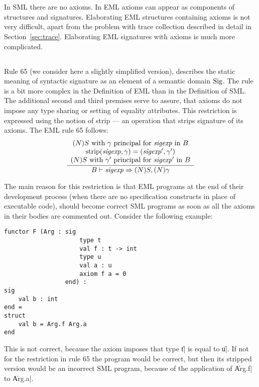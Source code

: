 \section{\secaxiom}
\label{sec:axiom}

In SML there are no axioms. In EML axioms can appear as components of structures and signatures.
Elaborating EML structures containing axioms is not very difficult, apart from the problem with
trace collection described in detail in Section~\ref{sec:trace}.
Elaborating EML signatures with axioms is much more complicated.

\subsection{\secinsig}
\label{sec:in_sig}

Rule 65 (we consider here a slightly simplified version), 
describes the static meaning of syntactic signature
as an element of a semantic domain ${\rm Sig}$.
The rule is a bit more complex in the Definition of EML than in the Definition of SML.
The additional second and third premises serve to assure, that
axioms do not impose any type sharing or setting of equality attributes. 
This restriction is expressed using the notion of strip ---
an operation that strips signature of its axioms. The EML rule 65 follows:
$$
\frac{\begin{array}{c}
\mbox{$(N)S$ with $\gamma$ principal for ${\it sigexp}$ in $B$}\\
\mbox{strip}({\it sigexp},\gamma)=({\it sigexp}',\gamma')\\
\mbox{$(N)S$ with $\gamma'$ principal for ${\it sigexp}'$ in $B$}
      \end{array}}
     {B\vdash{\it sigexp}\Rightarrow (N)S,(N)\gamma}
$$ %

The main reason for this restriction is that EML programs
at the end of their development process (when there are no specification constructs 
in place of executable code), should become correct SML
programs as soon as all the axioms in their bodies are commented out.
Consider the following example:
\begin{verbatim}
functor F (Arg : sig
                     type t
                     val f : t -> int
                     type u
                     val a : u                                         
                     axiom f a = 0
                 end) : 
sig
    val b : int
end =
struct
    val b = Arg.f Arg.a
end
\end{verbatim}
This is not correct, because the axiom imposes that type \|t| is equal to \|u|.
If not for the restriction in rule 65 the program would be correct, but then
its stripped version would be an incorrect SML program, 
because of the application of \|Arg.f| to \|Arg.a|.


